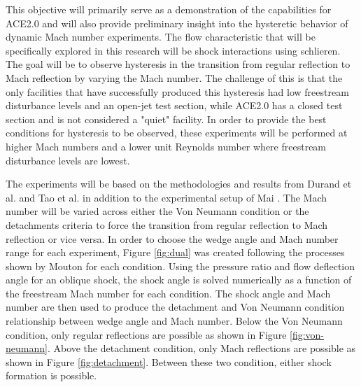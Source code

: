 This objective will primarily serve as a demonstration of the capabilities for ACE2.0 and will also provide preliminary insight into the hysteretic behavior of dynamic Mach number experiments. The flow characteristic that will be specifically explored in this research will be shock interactions using schlieren. The goal will be to observe hysteresis in the transition from regular reflection to Mach reflection by varying the Mach number. The challenge of this is that the only facilities that have successfully produced this hysteresis had low freestream disturbance levels and an open-jet test section, while ACE2.0 has a closed test section and is not considered a "quiet" facility. In order to provide the best conditions for hysteresis to be observed, these experiments will be performed at higher Mach numbers and a lower unit Reynolds number where freestream disturbance levels are lowest.

The experiments will be based on the methodologies and results from Durand et al. \cite{durand} and Tao et al. \cite{tao} in addition to the experimental setup of Mai \cite{mai-dis}. The Mach number will be varied across either the Von Neumann condition or the detachments criteria to force the transition from regular reflection to Mach reflection or vice versa. In order to choose the wedge angle and Mach number range for each experiment, Figure \ref{fig:dual} was created following the processes shown by Mouton \cite{mouton} for each condition. Using the pressure ratio and flow deflection angle for an oblique shock, the shock angle is solved numerically as a function of the freestream Mach number for each condition. The shock angle and Mach number are then used to produce the detachment and Von Neumann condition relationship between wedge angle and Mach number. Below the Von Neumann condition, only regular reflections are possible as shown in Figure \ref{fig:von-neumann}. Above the detachment condition, only Mach reflections are possible as shown in Figure \ref{fig:detachment}. Between these two condition, either shock formation is possible.



